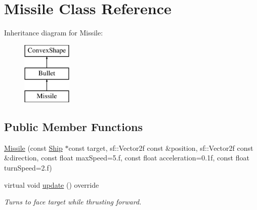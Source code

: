 \hypertarget{class_missile}{}\section{Missile Class Reference}
\label{class_missile}
Inheritance diagram for Missile\+:\begin{figure}[H]
\begin{center}
\leavevmode
\includegraphics[height=3.000000cm]{class_missile}
\end{center}
\end{figure}
\subsection*{Public Member Functions}
\begin{DoxyCompactItemize}
\item 
\hyperlink{class_missile_aea0c73fed2dbe063cca8dae4e67ce410}{Missile} (const \hyperlink{class_ship}{Ship} $\ast$const target, sf\+::\+Vector2f const \&position, sf\+::\+Vector2f const \&direction, const float max\+Speed=5.f, const float acceleration=0.\+1f, const float turn\+Speed=2.\+f)
\item 
\hypertarget{class_missile_a6bc00954b20db86b293fd4d98012cd09}{}virtual void \hyperlink{class_missile_a6bc00954b20db86b293fd4d98012cd09}{update} () override\label{class_missile_a6bc00954b20db86b293fd4d98012cd09}

\begin{DoxyCompactList}\small\item\em Turns to face target while thrusting forward. \end{DoxyCompactList}\end{DoxyCompactItemize}
